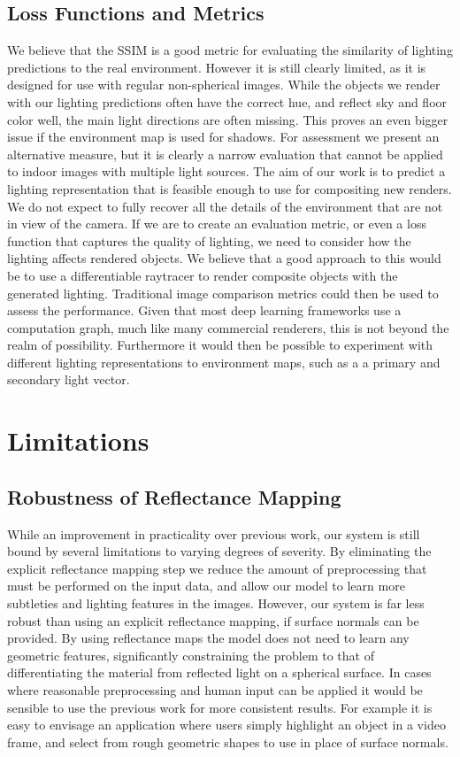 \documentclass[ %
                    author={Gavin Parker},
                supervisor={Dr. Neill Campbell},
                    degree={MEng},
                     title={Deep Siamese Networks for Illumination Estimation from Stereo Images},
                  subtitle={},
                      type={Research},
                      year={2018} ]{dissertation}
\begin{document}
\subsection{Loss Functions and Metrics}
We believe that the SSIM is a good metric for evaluating the similarity of lighting predictions to the real environment. However it is still clearly limited, as it is designed for use with regular non-spherical images. While the objects we render with our lighting predictions often have the correct hue, and reflect sky and floor color well, the main light directions are often missing. This proves an even bigger issue if the environment map is used for shadows. For assessment we present an alternative measure, but it is clearly a narrow evaluation that cannot be applied to indoor images with multiple light sources.
\newline
The aim of our work is to predict a lighting representation that is feasible enough to use for compositing new renders. We do not expect to fully recover all the details of the environment that are not in view of the camera. If we are to create an evaluation metric, or even a loss function that captures the quality of lighting, we need to consider how the lighting affects rendered objects. We believe that a good approach to this would be to use a differentiable raytracer to render composite objects with the generated lighting. Traditional image comparison metrics could then be used to assess the performance. Given that most deep learning frameworks use a computation graph, much like many commercial renderers, this is not beyond the realm of possibility. Furthermore it would then be possible to experiment with different lighting representations to environment maps, such as a a primary and secondary light vector.
\section{Limitations}
\subsection{Robustness of Reflectance Mapping}
While an improvement in practicality over previous work, our system is still bound by several limitations to varying degrees of severity. By eliminating the explicit reflectance mapping step we reduce the amount of preprocessing that must be performed on the input data, and allow our model to learn more subtleties and lighting features in the images. However, our system is far less robust than using an explicit reflectance mapping, if surface normals can be provided. By using reflectance maps the model does not need to learn any geometric features, significantly constraining the problem to that of differentiating the material from reflected light on a spherical surface. In cases where reasonable preprocessing and human input can be applied it would be sensible to use the previous work for more consistent results. For example it is easy to envisage an application where users simply highlight an object in a video frame, and select from rough geometric shapes to use in place of surface normals.
\end{document}
